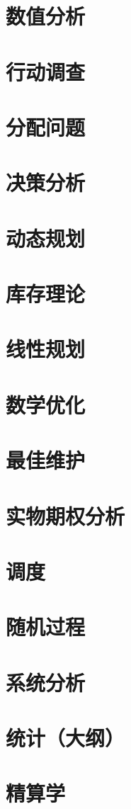 \section{数值分析}
\section{行动调查}
\section{分配问题}
\section{决策分析}
\section{动态规划}
\section{库存理论}
\section{线性规划}
\section{数学优化}
\section{最佳维护}
\section{实物期权分析}
\section{调度}
\section{随机过程}
\section{系统分析}
\section{统计（大纲）}
\section{精算学}
